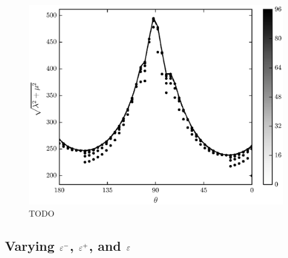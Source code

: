 	\begin{figure}
		\begin{center}
			\includegraphics{./fig/ch3/pull/et10/grid.eps}
		\end{center}		
		\caption{ TODO
		\label{fig:PullGrid:et10}}
	\end{figure}

\subsection{Varying $\varepsilon^-$, $\varepsilon^+$, and $\varepsilon$} \label{section:detachment:eps}

